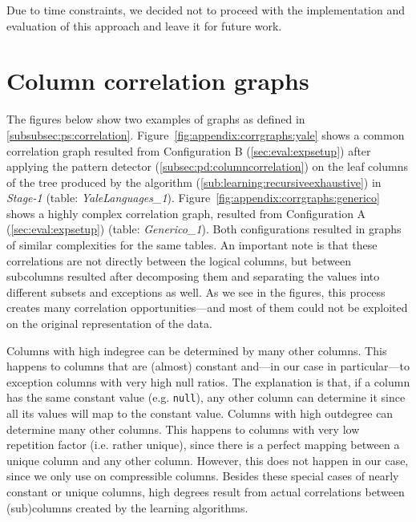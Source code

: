 \begin{appendices}
Due to time constraints, we decided not to proceed with the implementation and evaluation of this approach and leave it for future work.

\chapter{Column correlation graphs}
\label{appendix:corrgraphs}

The figures below show two examples of  graphs as defined in \ref{subsubsec:ps:correlation}. Figure~\ref{fig:appendix:corrgraphs:yale} shows a common correlation graph resulted from Configuration B (\ref{sec:eval:expsetup}) after applying the  pattern detector (\ref{subsec:pd:columncorrelation}) on the leaf columns of the tree produced by the  algorithm (\ref{sub:learning:recursiveexhaustive}) in \textit{Stage-1} (table: \textit{YaleLanguages\_1}).
Figure~\ref{fig:appendix:corrgraphs:generico} shows a highly complex correlation graph, resulted from Configuration A (\ref{sec:eval:expsetup}) (table: \textit{Generico\_1}). Both configurations resulted in graphs of similar complexities for the same tables. An important note is that these correlations are not directly between the logical columns, but between subcolumns resulted after decomposing them and separating the values into different subsets and exceptions as well. As we see in the figures, this process creates many correlation opportunities---and most of them could not be exploited on the original representation of the data.

Columns with high indegree can be determined by many other columns. This happens to columns that are (almost) constant and---in our case in particular---to exception columns with very high null ratios. The explanation is that, if a column has the same constant value (e.g. \verb|null|), any other column can determine it since all its values will map to the constant value. Columns with high outdegree can determine many other columns. This happens to columns with very low repetition factor (i.e. rather unique), since there is a perfect mapping between a unique column and any other column. However, this does not happen in our case, since we only use  on  compressible columns. Besides these special cases of nearly constant or unique columns, high degrees result from actual correlations between (sub)columns created by the learning algorithms.


\end{appendices}
